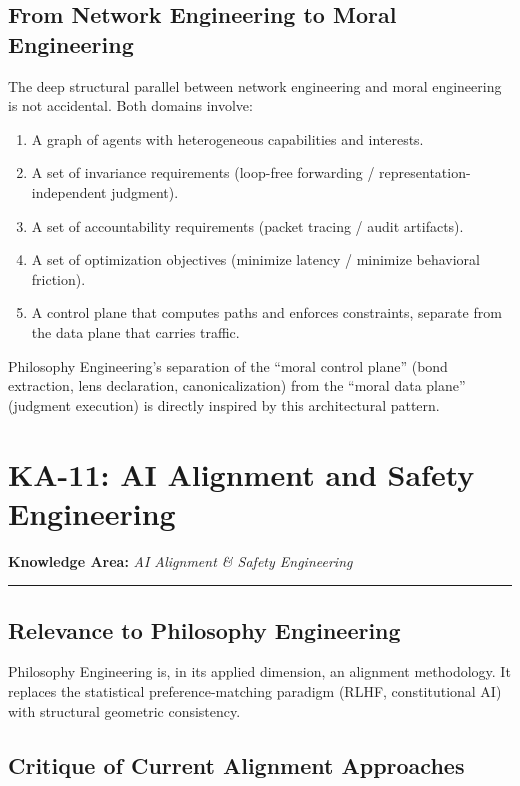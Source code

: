 \documentclass[12pt,letterpaper]{article}
\theoremstyle{definition}
\theoremstyle{plain}
\newcommand{\ka}[1]{\vspace{1em}\noindent\textbf{\large Knowledge Area:} \textit{#1}\vspace{0.5em}\hrule\vspace{0.5em}}
\begin{document}
\subsection{From Network Engineering to Moral Engineering}

The deep structural parallel between network engineering and moral engineering is not accidental. Both domains involve:
\begin{enumerate}
    \item A graph of agents with heterogeneous capabilities and interests.
    \item A set of invariance requirements (loop-free forwarding / representation-independent judgment).
    \item A set of accountability requirements (packet tracing / audit artifacts).
    \item A set of optimization objectives (minimize latency / minimize behavioral friction).
    \item A control plane that computes paths and enforces constraints, separate from the data plane that carries traffic.
\end{enumerate}
Philosophy Engineering's separation of the ``moral control plane'' (bond extraction, lens declaration, canonicalization) from the ``moral data plane'' (judgment execution) is directly inspired by this architectural pattern.


\section{KA-11: AI Alignment and Safety Engineering}
\label{sec:ka11}

\ka{AI Alignment \& Safety Engineering}

\subsection{Relevance to Philosophy Engineering}

Philosophy Engineering is, in its applied dimension, an alignment methodology. It replaces the statistical preference-matching paradigm (RLHF, constitutional AI) with structural geometric consistency.

\subsection{Critique of Current Alignment Approaches}
\end{document}

